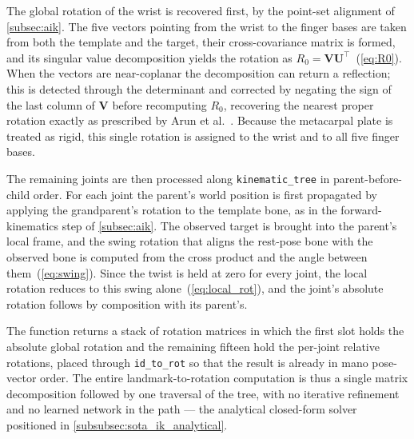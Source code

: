 The global rotation of the wrist is recovered first, by the point-set alignment of
\autoref{subsec:aik}. The five vectors pointing from the wrist to the finger bases
are taken from both the template and the target, their cross-covariance matrix is
formed, and its singular value decomposition yields the rotation as
$R_0 = \mathbf{V}\mathbf{U}^{\top}$~(\autoref{eq:R0}). When the vectors are
near-coplanar the decomposition can return a reflection; this is detected through
the determinant and corrected by negating the sign of the last column of
$\mathbf{V}$ before recomputing $R_0$, recovering the nearest proper rotation
exactly as prescribed by Arun et al.~\cite{arun1987leastsquares}. Because the
metacarpal plate is treated as rigid, this single rotation is assigned to the
wrist and to all five finger bases.

The remaining joints are then processed along \texttt{kinematic\_tree} in
parent-before-child order. For each joint the parent's world position is first
propagated by applying the grandparent's rotation to the template bone, as in the
forward-kinematics step of \autoref{subsec:aik}. The observed target is brought
into the parent's local frame, and the swing rotation that aligns the rest-pose
bone with the observed bone is computed from the cross product and the angle
between them~(\autoref{eq:swing}). Since the twist is held at zero for every
joint, the local rotation reduces to this swing alone~(\autoref{eq:local_rot}),
and the joint's absolute rotation follows by composition with its parent's.

The function returns a stack of rotation matrices in which the first slot holds the
absolute global rotation and the remaining fifteen hold the per-joint relative
rotations, placed through \texttt{id\_to\_rot} so that the result is already in
\acrshort{mano} pose-vector order. The entire landmark-to-rotation computation is
thus a single matrix decomposition followed by one traversal of the tree, with no
iterative refinement and no learned network in the path --- the analytical
closed-form solver positioned in \autoref{subsubsec:sota_ik_analytical}.

